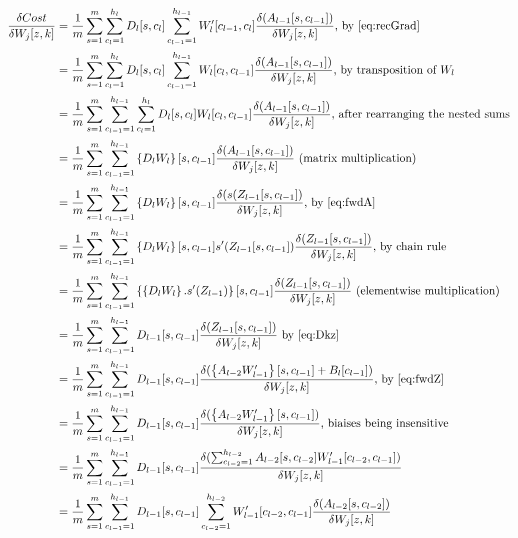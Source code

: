 \documentclass[]{article}
\begin{document}
\begin{align*}
\dfrac{\delta Cost}{\delta W_{j}[z,k]}&=\frac{1}{m}\sum_{s=1}^{m}\sum_{c_{l}=1}^{h_{l}}D_{l}[s,c_{l}] \sum_{c_{l-1}=1}^{h_{l-1}}W_{l}' [c_{l-1},c_{l}]\dfrac{\delta (A_{l-1}[s,c_{l-1}])}{\delta W_{j}[z,k]} \text{, by $\eqref{eq:recGrad}$}\\
&=\frac{1}{m}\sum_{s=1}^{m}\sum_{c_{l}=1}^{h_{l}}D_{l}[s,c_{l}] \sum_{c_{l-1}=1}^{h_{l-1}}W_{l} [c_{l},c_{l-1}]\dfrac{\delta (A_{l-1}[s,c_{l-1}])}{\delta W_{j}[z,k]} \text{, by transposition of $W_l$}\\
&=\frac{1}{m}\sum_{s=1}^{m} \sum_{c_{l-1}=1}^{h_{l-1}}\sum_{c_{l}=1}^{h_{l}}D_{l}[s,c_{l}]W_{l} [c_{l},c_{l-1}]\dfrac{\delta (A_{l-1}[s,c_{l-1}])}{\delta W_{j}[z,k]} \text{, after rearranging the nested sums}\\
&=\frac{1}{m}\sum_{s=1}^{m} \sum_{c_{l-1}=1}^{h_{l-1}} \left\lbrace D_{l}W_{l}\right\rbrace  [s,c_{l-1}]\dfrac{\delta (A_{l-1}[s,c_{l-1}])}{\delta W_{j}[z,k]} \text{ (matrix multiplication)}\\
&=\frac{1}{m}\sum_{s=1}^{m} \sum_{c_{l-1}=1}^{h_{l-1}} \left\lbrace D_{l}W_{l}\right\rbrace  [s,c_{l-1}]\dfrac{\delta (s(Z_{l-1}[s,c_{l-1}])}{\delta W_{j}[z,k]} \text{, by $\eqref{eq:fwdA}$}\\
&=\frac{1}{m}\sum_{s=1}^{m} \sum_{c_{l-1}=1}^{h_{l-1}} \left\lbrace D_{l}W_{l}\right\rbrace  [s,c_{l-1}]s'(Z_{l-1}[s,c_{l-1}])\dfrac{\delta (Z_{l-1}[s,c_{l-1}])}{\delta W_{j}[z,k]} \text{, by chain rule}\\
&=\frac{1}{m}\sum_{s=1}^{m} \sum_{c_{l-1}=1}^{h_{l-1}} \left\lbrace  \left\lbrace D_{l}W_{l}\right\rbrace . s'(Z_{l-1}) \right\rbrace [s,c_{l-1}]\dfrac{\delta (Z_{l-1}[s,c_{l-1}])}{\delta W_{j}[z,k]} \text{ (elementwise multiplication)}\\
&=\frac{1}{m}\sum_{s=1}^{m} \sum_{c_{l-1}=1}^{h_{l-1}} D_{l-1} [s,c_{l-1}]\dfrac{\delta (Z_{l-1}[s,c_{l-1}])}{\delta W_{j}[z,k]} \text{ by $\eqref{eq:Dkz}$}\\
&=\frac{1}{m}\sum_{s=1}^{m} \sum_{c_{l-1}=1}^{h_{l-1}} D_{l-1} [s,c_{l-1}]\dfrac{\delta (\left\lbrace A_{l-2}W_{l-1}' \right\rbrace [s,c_{l-1}] +B_{l}[c_{l-1}])}{\delta W_{j}[z,k]} \text{, by $\eqref{eq:fwdZ}$}\\
&=\frac{1}{m}\sum_{s=1}^{m} \sum_{c_{l-1}=1}^{h_{l-1}} D_{l-1} [s,c_{l-1}]\dfrac{\delta (\left\lbrace A_{l-2}W_{l-1}' \right\rbrace [s,c_{l-1}])}{\delta W_{j}[z,k]} \text{, biaises being insensitive} \\
&=\frac{1}{m}\sum_{s=1}^{m} \sum_{c_{l-1}=1}^{h_{l-1}} D_{l-1} [s,c_{l-1}]\dfrac{\delta(\sum_{c_{l-2}=1}^{h_{l-2}} A_{l-2}[s,c_{l-2}] W_{l-1}' [c_{l-2},c_{l-1}] )}{\delta W_{j}[z,k]}\\
&=\frac{1}{m}\sum_{s=1}^{m} \sum_{c_{l-1}=1}^{h_{l-1}} D_{l-1} [s,c_{l-1}]\sum_{c_{l-2}=1}^{h_{l-2}}W_{l-1}' [c_{l-2},c_{l-1}] \dfrac{\delta  (A_{l-2}[s,c_{l-2}]  )}{\delta W_{j}[z,k]}\\
\end{align*}
\end{document}
